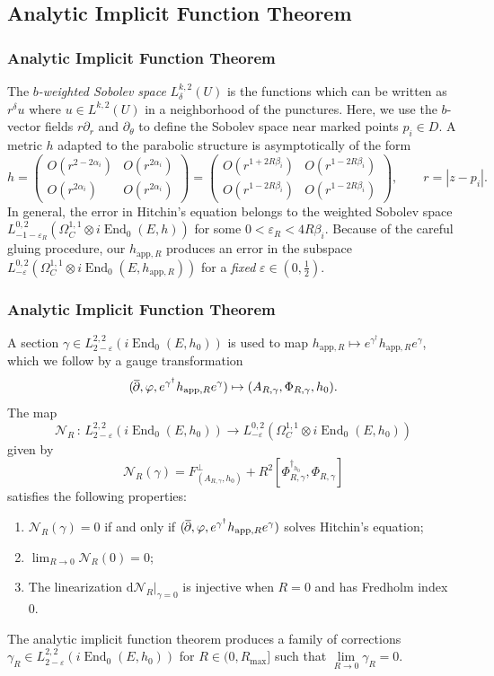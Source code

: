 \documentclass[aspectratio=1610,10pt]{beamer}
\theoremstyle{definition}
\theoremstyle{named}
\renewcommand{\bar}[1]{\overline{\hspace{-1pt}{#1}\hspace{-.2pt}}}
\newcommand{\de}{\text{d}}
\newcommand{\from}{\,:\,}
\newcommand{\eps}{\varepsilon}
\DeclareMathOperator{\delbar}{\bar\partial}
\DeclareMathOperator{\End}{End}
\begin{document}
\subsection{Analytic Implicit Function Theorem}
\begin{frame}
    \frametitle{Analytic Implicit Function Theorem}
    The \emph{$b$-weighted Sobolev space} $L_\delta^{k,2}(U)$ is the functions which can be written as $r^\delta u$ where $u\in L^{k,2}(U)$ in a neighborhood of the punctures.  Here, we use the $b$-vector fields $r\partial_r$ and $\partial_\theta$ to define the Sobolev space near marked points $p_i\in D$.
    \vfill
    \pause
    A metric $h$ adapted to the parabolic structure is asymptotically of the form
        $$h=\begin{pmatrix}O(r^{2-2\alpha_i})&O(r^{2\alpha_i})\\O(r^{2\alpha_i})&O(r^{2\alpha_i})\end{pmatrix}=\begin{pmatrix}O(r^{1+2R\beta_i})&O(r^{1-2R\beta_i})\\O(r^{1-2R\beta_i})&O(r^{1-2R\beta_i})\end{pmatrix},\qquad r=|z-p_i|.$$
    In general, the error in Hitchin's equation belongs to the weighted Sobolev space $L_{-1-\eps_R}^{0,2}(\Omega_C^{1,1}\otimes i\End_0(E,h))$ for some $0<\eps_R<4R\beta_i$.
    \vfill
    \pause
    Because of the careful gluing procedure, our $h_{\mathrm{app},R}$ produces an error in the subspace $L_{-\eps}^{0,2}(\Omega_C^{1,1}\otimes i\End_0(E,h_{\mathrm{app},R}))$ for a \emph{fixed} $\eps\in(0,\frac12)$.
\end{frame}

\begin{frame}
    \frametitle{Analytic Implicit Function Theorem}
    A section $\gamma\in L_{2-\eps}^{2,2}(i\End_0(E,h_0))$ is used to map $h_{\mathrm{app},R}\mapsto e^{\gamma^\dagger}h_{\mathrm{app},R}e^{\gamma}$, which we follow by a gauge transformation
        $$(\delbar,\varphi,e^{\gamma^\dagger}h_{\mathrm{app},R}e^\gamma)\mapsto (A_{R,\gamma},\Phi_{R,\gamma},h_0).$$
    \vfill
    \pause
    The map
        $$\mathcal N_R\from L_{2-\eps}^{2,2}(i\End_0(E,h_0))\to L_{-\eps}^{0,2}(\Omega_C^{1,1}\otimes i\End_0(E,h_0))$$
    given by
        $$\mathcal N_R(\gamma)=F_{(A_{R,\gamma},h_0)}^\perp+R^2\left[\Phi_{R,\gamma}^{\dagger_{h_0}},\Phi_{R,\gamma}\right]$$
    satisfies the following properties:
    \begin{enumerate}
        \item $\mathcal N_R(\gamma)=0$ if and only if $(\delbar,\varphi,e^{\gamma^\dagger}h_{\mathrm{app},R}e^\gamma)$ solves Hitchin's equation;
        \item $\lim_{R\to0}\mathcal N_R(0)=0$;
        \item The linearization $\de\mathcal N_R\big|_{\gamma=0}$ is injective when $R=0$ and has Fredholm index 0.
    \end{enumerate}
    \pause
    The analytic implicit function theorem produces a family of corrections $\gamma_R\in L_{2-\eps}^{2,2}(i\End_0(E,h_0))$ for $R\in(0,R_{\max}]$ such that $\lim\limits_{R\to0}\gamma_R=0$.
    \vfill
\end{frame}
\end{document}
